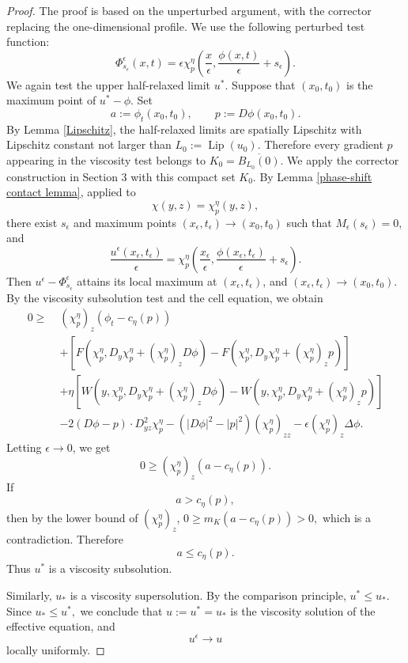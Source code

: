\documentclass[preprint]{elsarticle}
\numberwithin{equation}{section}
\begin{document}
\begin{proof}
 The proof is based on the unperturbed argument, with the corrector replacing the one-dimensional profile. We use the following perturbed test function:
\begin{equation*}
\Phi_{s_\epsilon}^\epsilon(x,t)
=
\epsilon
\chi_p^\eta\left(
\frac{x}{\epsilon},
\frac{\phi(x,t)}{\epsilon}+s_\epsilon
\right).
\end{equation*}
We again test the upper half-relaxed limit $u^*$. Suppose that $(x_0,t_0)$ is the maximum point of $u^*-\phi$. Set
$$
a:=\phi_t(x_0,t_0),
\qquad
p:=D\phi(x_0,t_0).
$$
By Lemma \ref{Lipschitz}, the half-relaxed limits are spatially Lipschitz with Lipschitz constant not larger than $L_0:=\operatorname{Lip}(u_0)$. Therefore every gradient $p$ appearing in the viscosity test belongs to
$
K_0=\overline{B_{L_0}(0)}.
$
We apply the corrector construction in Section 3 with this compact set $K_0$.
By Lemma \ref{phase-shift contact lemma}, applied to
$$
\chi(y,z)=\chi_p^\eta(y,z),
$$
there exist $s_\epsilon$ and maximum points $(x_\epsilon,t_\epsilon)\to(x_0,t_0)$ such that $M_\epsilon(s_\epsilon)=0,$
and
\begin{equation*}
\frac{u^\epsilon(x_\epsilon,t_\epsilon)}{\epsilon}
=
\chi_p^\eta\left(
\frac{x_\epsilon}{\epsilon},
\frac{\phi(x_\epsilon,t_\epsilon)}{\epsilon}+s_\epsilon
\right).
\end{equation*}
Then $u^\epsilon-\Phi_{s_\epsilon}^\epsilon$ attains its local maximum at $(x_\epsilon,t_\epsilon)$, and
$
(x_\epsilon,t_\epsilon)\to(x_0,t_0).
$
By the viscosity subsolution test and the cell equation, we obtain
\begin{align*}
0\ge\;&
(\chi_p^\eta)_z\left(\phi_t-c_\eta(p)\right)
\\
&+
\left[
F\left(\chi_p^\eta,D_y\chi_p^\eta+(\chi_p^\eta)_zD\phi\right)
-
F\left(\chi_p^\eta,D_y\chi_p^\eta+(\chi_p^\eta)_zp\right)
\right]
\\
&+
\eta
\left[
W\left(y,\chi_p^\eta,D_y\chi_p^\eta+(\chi_p^\eta)_zD\phi\right)
-
W\left(y,\chi_p^\eta,D_y\chi_p^\eta+(\chi_p^\eta)_zp\right)
\right]
\\
&-
2(D\phi-p)\cdot D^2_{yz}\chi_p^\eta
-
\left(|D\phi|^2-|p|^2\right)(\chi_p^\eta)_{zz}
-
\epsilon(\chi_p^\eta)_z\Delta\phi.
\end{align*}
Letting $\epsilon\to0$, we get
\begin{equation*}
0\ge(\chi_p^\eta)_z(a-c_\eta(p)).
\end{equation*}
If
$$
a>c_\eta(p),
$$
then by the lower bound of $(\chi_p^\eta)_z$,
$
0\ge m_K(a-c_\eta(p))>0,
$
which is a contradiction. Therefore
$$
a\le c_\eta(p).
$$
Thus $u^*$ is a viscosity subsolution.

Similarly, $u_*$ is a viscosity supersolution. By the comparison principle,
$
u^*\le u_*.
$
Since
$
u_*\le u^*,
$
we conclude that
$
u:=u^*=u_*
$
is the viscosity solution of the effective equation, and
$$
u^\epsilon\to u
$$
locally uniformly.
\end{proof}
\end{document}
